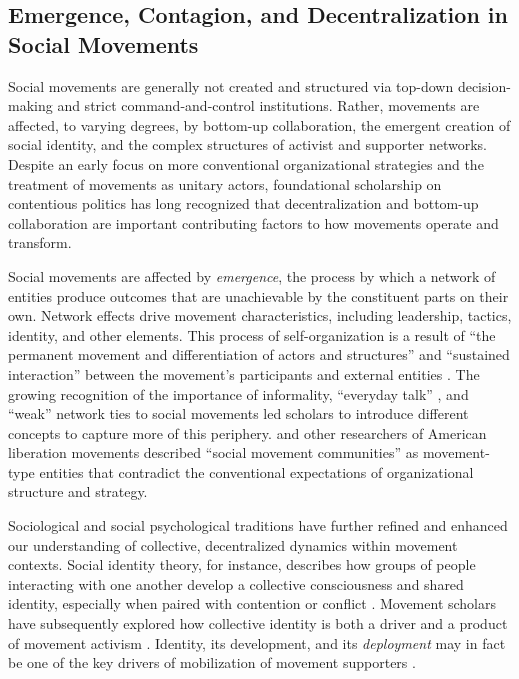 \documentclass[12pt]{article}
\begin{document}
\subsection{Emergence, Contagion, and Decentralization in Social Movements}

Social movements are generally not created and structured via top-down decision-making and strict command-and-control institutions. Rather, movements are affected, to varying degrees, by bottom-up collaboration, the emergent creation of social identity, and the complex structures of activist and supporter networks. Despite an early focus on more conventional organizational strategies and the treatment of movements as unitary actors, foundational scholarship on contentious politics has long recognized that decentralization and bottom-up collaboration are important contributing factors to how movements operate and transform.

Social movements are affected by \textit{emergence}, the process by which a network of entities produce outcomes that are unachievable by the constituent parts on their own. Network effects drive movement characteristics, including leadership, tactics, identity, and other elements. This process of self-organization is a result of ``the permanent movement and differentiation of actors and structures'' \parencite{fuchs2006self} and ``sustained interaction'' between the movement's participants and external entities \parencite{tilly1979social}. The growing recognition of the importance of informality, ``everyday talk'' \parencite{mansbridge1999everyday}, and ``weak'' network ties to social movements led scholars to introduce different concepts to capture more of this periphery. \textcite{buechler1990women} and other researchers of American liberation movements described ``social movement communities'' as movement-type entities that contradict the conventional expectations of organizational structure and strategy.

Sociological and social psychological traditions have further refined and enhanced our understanding of collective, decentralized dynamics within movement contexts. Social identity theory, for instance, describes how groups of people interacting with one another develop a collective consciousness and shared identity, especially when paired with contention or conflict \parencite{tajfel1974social}. Movement scholars have subsequently explored how collective identity is both a driver and a product of movement activism \parencite{flesher2010collective, polletta2001collective, huddy2001social}. Identity, its development, and its \textit{deployment} may in fact be one of the key drivers of mobilization of movement supporters \parencite{touraine1985introduction, castells2011power}.
\end{document}
